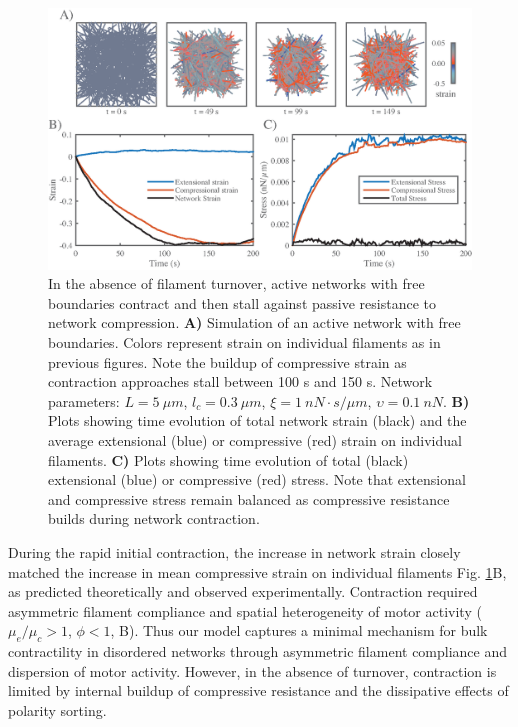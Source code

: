 \begin{figure}[H]
	\centering
	\includegraphics[width=\hsize]{active/figures/Fig5}
	\caption{\label{fig:active_con} In the absence of filament turnover, active networks with free boundaries contract and then stall against passive resistance to network compression. \textbf{A)}  Simulation of an active network with free boundaries. Colors represent strain on individual filaments as in previous figures.  Note the buildup of compressive strain as contraction approaches stall between 100 s and 150 s.  Network parameters: $L=5\: \mu m$, $l_c=0.3\: \mu m$, $\xi=1\: nN\cdot s/\mu m$, $\upsilon=0.1\: nN$.  \textbf{B)} Plots showing time evolution of total network strain (black) and the average extensional (blue) or compressive (red) strain on individual filaments.   \textbf{C)} Plots showing time evolution of total (black) extensional (blue) or compressive (red) stress.  Note that extensional and compressive stress remain balanced as compressive resistance builds during network contraction.}
\end{figure}

During the rapid initial contraction, the increase in network strain closely matched the increase in mean compressive strain on individual filaments Fig. \ref{fig:active_con}B, as predicted theoretically \cite{1367-2630-14-3-033037,PhysRevX.4.041002} and observed experimentally\cite{rheo_2D1}. Contraction required asymmetric filament compliance and spatial heterogeneity of motor activity ($\mu_e/\mu_c > 1$, $\phi<1$, B). Thus our model captures a minimal mechanism for bulk contractility in disordered networks through asymmetric filament compliance and dispersion of motor activity. However, in the absence of turnover, contraction is limited by internal buildup of compressive resistance and the dissipative effects of polarity sorting.


